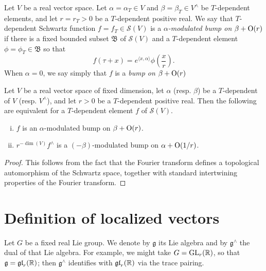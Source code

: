 \documentclass[reqno]{amsart} 
\numberwithin{equation}{section}
\begin{document}
\begin{definition}\label{definition:d1a910775837}
  Let $V$ be a real vector space.  Let $\alpha = \alpha_T \in V$ and $\beta = \beta_T \in V^\wedge$ be $T$-dependent elements, and let $r = r_T > 0$ be a $T$-dependent positive real.  We say that $T$-dependent Schwartz function $f = f_T \in \mathcal{S}(V)$ is a $\alpha$\emph{-modulated bump on} $\beta + \operatorname{O}(r)$ if there is a fixed bounded subset $\mathfrak{B}$ of $\mathcal{S}(V)$ and a $T$-dependent element $\phi = \phi_T \in \mathfrak{B}$ so that
  \begin{equation*}
f(\tau + x) =  e^{\langle x, \alpha \rangle} \phi\left( \frac{x }{r} \right).
\end{equation*}
When $\alpha = 0$, we say simply that $f$ is a \emph{bump on } $\beta + \operatorname{O}(r)$ 
\end{definition}

\begin{lemma}
  Let $V$ be a real vector space of fixed dimension, let $\alpha$ (resp. $\beta$) be a $T$-dependent of $V$ (resp. $V^\wedge$), and let $r > 0$ be a $T$-dependent positive real.  Then the following are equivalent for a $T$-dependent element $f$ of $\mathcal{S}(V)$.
\begin{enumerate}[(i)]
\item $f$ is an  $\alpha$-modulated bump on $\beta + \operatorname{O}(r)$.  
\item $r^{-\dim(V)} f^\wedge$ is a $(-\beta)$-modulated bump on $\alpha + \operatorname{O}(1/r)$.
\end{enumerate}  
\end{lemma}
\begin{proof}
This follows from the fact that the Fourier transform defines a topological automorphism of the Schwartz space, together with standard intertwining properties of the Fourier transform.
\end{proof}



\section{Definition of localized vectors}\label{sec:d1a8de614cc9}
Let $G$ be a fixed real Lie group.  We denote by $\mathfrak{g}$ its Lie algebra and by $\mathfrak{g}^\wedge$ the dual of that Lie algebra.  For example, we might take $G = \operatorname{GL}_r(\mathbb{R})$, so that $\mathfrak{g} = \operatorname{\mathfrak{g}\mathfrak{l}}_r(\mathbb{R})$; then $\mathfrak{g}^\wedge$ identifies with $\operatorname{\mathfrak{g}\mathfrak{l}}_r(\mathbb{R})$ via the trace pairing.
\end{document}

